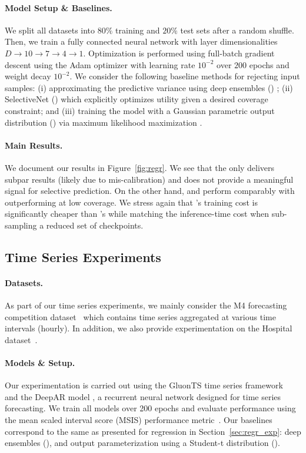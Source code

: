 \paragraph{Model Setup \& Baselines.} We split all datasets into $80\%$ training and $20\%$ test sets after a random shuffle. Then, we train a fully connected neural network with layer dimensionalities $D \rightarrow 10 \rightarrow 7 \rightarrow 4 \rightarrow 1$. Optimization is performed using full-batch gradient descent using the Adam optimizer with learning rate $10^{-2}$ over $200$ epochs and weight decay $10^{-2}$. We consider the following baseline methods for rejecting input samples: (i) approximating the predictive variance using deep ensembles (\de) \citep{balaji2017uncertainty, zaoui2020regression}; (ii) SelectiveNet (\sn) which explicitly optimizes utility given a desired coverage constraint; and (iii) training the model with a Gaussian parametric output distribution (\odist) via maximum likelihood maximization \citep{alexandrov2019gluonts}.

\paragraph{Main Results.} We document our results in Figure~\ref{fig:regr}. We see that the \odist only delivers subpar results (likely due to mis-calibration) and does not provide a meaningful signal for selective prediction. On the other hand, \de and \sptd perform comparably with \sptd outperforming \de at low coverage. We stress again that \sptd's training cost is significantly cheaper than \de's while matching the inference-time cost when sub-sampling a reduced set of checkpoints. 

\subsection{Time Series Experiments}
\label{sec:ts_exp}

\paragraph{Datasets.} As part of our time series experiments, we mainly consider the M4 forecasting competition dataset~\citep{makridakis2020m4} which contains time series aggregated at various time intervals (\eg hourly). In addition, we also provide experimentation on the Hospital dataset~\citep{hyndman2015expsmooth}.

\paragraph{Models \& Setup.} Our experimentation is carried out using the GluonTS time series framework~\citep{alexandrov2019gluonts} and the DeepAR model \citep{salinas2020deepar}, a recurrent neural network designed for time series forecasting. We train all models over 200 epochs and evaluate performance using the mean scaled interval score (MSIS) performance metric~\citep{makridakis2020m4}. Our baselines correspond to the same as presented for regression in Section~\ref{sec:regr_exp}: deep ensembles (\de), and output parameterization using a Student-t distribution (\odist).

